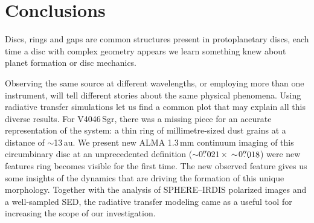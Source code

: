 \documentclass[fleqn,usenatbib,useAMS]{mnras}
\begin{document}
\section{Conclusions} \label{sec:Conclusions}

Discs, rings and gaps are common structures present in protoplanetary discs, each time a disc with complex geometry appears we learn something knew about planet formation or disc mechanics.

Observing the same source at different wavelengths, or employing more than one instrument, will tell different stories about the same physical phenomena. Using radiative transfer simulations let us find a common plot that may explain all this diverse results. For V4046\,Sgr, there was a missing piece for an accurate representation of the system: a thin ring of millimetre-sized dust grains at a distance of $\sim$13\,au. We present new ALMA 1.3\,mm continuum imaging of this circumbinary disc at an unprecedented definition ($\sim$0$\hbox{$.\!\!^{\prime\prime}$}021 \, \times \, \sim$0$\hbox{$.\!\!^{\prime\prime}$}018$) were new features ring becomes visible for the first time. The new observed feature gives us some insights of the dynamics that are driving the formation of this unique morphology. Together with the analysis of SPHERE--IRDIS polarized images and a well-sampled SED, the radiative transfer modeling came as a useful tool for increasing the scope of our investigation.
\end{document}
